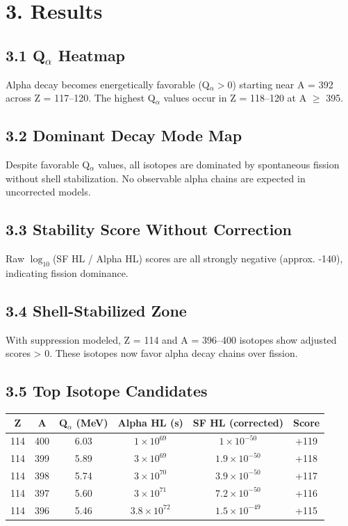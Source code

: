 \documentclass[12pt]{article}
\begin{document}
\section*{3. Results}

\subsection*{3.1 Q$_\alpha$ Heatmap}
Alpha decay becomes energetically favorable (Q$_\alpha > 0$) starting near A = 392 across Z = 117--120. The highest Q$_\alpha$ values occur in Z = 118--120 at A $\geq$ 395.

\subsection*{3.2 Dominant Decay Mode Map}
Despite favorable Q$_\alpha$ values, all isotopes are dominated by spontaneous fission without shell stabilization. No observable alpha chains are expected in uncorrected models.

\subsection*{3.3 Stability Score Without Correction}
Raw $\log_{10}$(SF HL / Alpha HL) scores are all strongly negative (approx. -140), indicating fission dominance.

\subsection*{3.4 Shell-Stabilized Zone}
With suppression modeled, Z = 114 and A = 396--400 isotopes show adjusted scores > 0. These isotopes now favor alpha decay chains over fission.

\subsection*{3.5 Top Isotope Candidates}

\begin{center}
\begin{tabular}{|c|c|c|c|c|c|}
\hline
Z & A & Q$_\alpha$ (MeV) & Alpha HL (s) & SF HL (corrected) & Score \\\hline
114 & 400 & 6.03 & $1\times10^{69}$ & $1\times10^{-50}$ & +119 \\\hline
114 & 399 & 5.89 & $3\times10^{69}$ & $1.9\times10^{-50}$ & +118 \\\hline
114 & 398 & 5.74 & $3\times10^{70}$ & $3.9\times10^{-50}$ & +117 \\\hline
114 & 397 & 5.60 & $3\times10^{71}$ & $7.2\times10^{-50}$ & +116 \\\hline
114 & 396 & 5.46 & $3.8\times10^{72}$ & $1.5\times10^{-49}$ & +115 \\\hline
\end{tabular}
\end{center}
\end{document}
